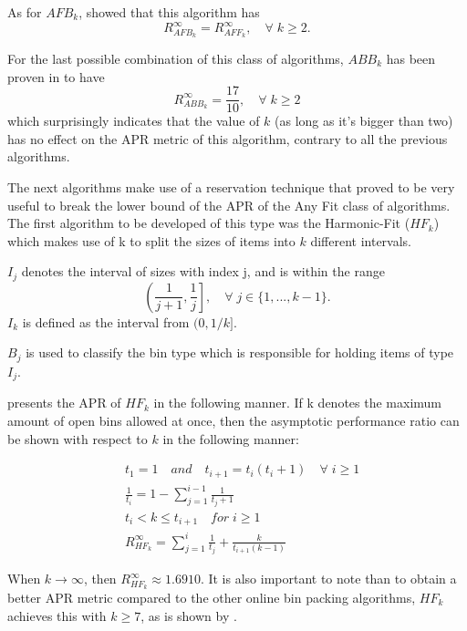 As for $AFB_k$, \cite{zhang1994tight} showed that this algorithm has
\begin{equation}
    R_{AFB_k}^\infty = R_{AFF_k}^\infty, \quad  \forall \; k \geq 2.
\end{equation}

For the last possible combination of this class of algorithms, $ABB_k$ has been
proven in \cite{csirik2001bounded} to have 
\begin{equation}
    R_{ABB_k}^\infty = \frac{17}{10},  \quad \forall \; k \geq 2
\end{equation}
which surprisingly indicates that the value of $k$ (as long as it's bigger than
two) has no effect on the APR metric of this algorithm, contrary to all the
previous algorithms.

The next algorithms make use of a reservation technique that proved to be very
useful to break the lower bound of the APR of the Any Fit class of algorithms.
The first algorithm to be developed of this type was the Harmonic-Fit ($HF_k$)
which makes use of k to split the sizes of items into $k$ different intervals.

$I_j$ denotes the interval of sizes with index j, and is within the range 
\begin{equation}
    \left (\frac{1}{j+1}, \frac{1}{j} \right], \quad \forall \; j \in \{1, ..., k-1\}.
\end{equation}
$I_k$ is defined as the interval from $(0, 1/k]$.

$B_j$ is used to classify the bin type which is responsible for holding items of
type $I_j$.

\cite{lee1985simple} presents the APR of $HF_k$ in the following manner. If k
denotes the maximum amount of open bins allowed at once, then the asymptotic
performance ratio can be shown with respect to $k$ in the following manner:

\begin{align}
    & t_1 = 1 \quad and \quad t_{i+1} = t_i(t_i + 1) \quad \forall \; i \geq 1 \\
    & \frac{1}{t_i} = 1 - \sum_{j=1}^{i-1} \frac{1}{t_j + 1} \\
    & t_i < k \leq t_{i+1} \quad for \; i \geq 1 \\
    & R_{HF_k}^\infty = \sum_{j=1}^{i} \frac{1}{t_j} + \frac{k}{t_{i+1}(k-1)}
\end{align}

When $k \to \infty$, then $R_{HF_k}^\infty \approx 1.6910$. It is also important
to note than to obtain a better APR metric compared to the other online bin
packing algorithms, $HF_k$ achieves this with $k \geq 7$, as is shown by
\cite{lee1985simple}.

